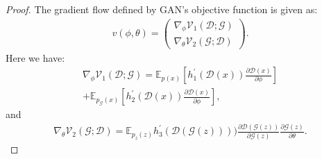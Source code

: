 \documentclass{article}
\newcommand{\ep}{\mathbb{E}}
\newcommand{\xG}{\mathcal{G}}
\newcommand{\xD}{\mathcal{D}}
\newcommand{\uV}{\mathcal{V}}
\theoremstyle{definition}
\begin{document}
\begin{proof}
	The gradient flow defined by GAN's objective function is given as:
	\begin{align}
	v(\phi, \theta) = \begin{pmatrix}
	\nabla_\phi \uV_1(\xD; \xG) \\
	\nabla_\theta \uV_2(\xG; \xD)
	\end{pmatrix}.
	\end{align}
	Here we have:
	\begin{align}
	\nabla_\phi \uV_1(\xD; \xG) = \ep_{p(x)}[h_1^\prime(\xD(x))\frac{\partial \xD(x)}{\partial \phi}] \\ + \ep_{p_\xG(x)}[h_2^\prime(\xD(x))\frac{\partial \xD(x)}{\partial \phi}],
	\end{align}
	and 
	\begin{align}
	\nabla_\theta \uV_2(\xG; \xD) = \ep_{p_z(z)}h_3^\prime(\xD(\xG(z))))\frac{\partial \xD(\xG(z))}{\partial \xG(z)} \frac{\partial \xG(z)}{\partial \theta}.
	\end{align}
	

\end{proof}
\end{document}
